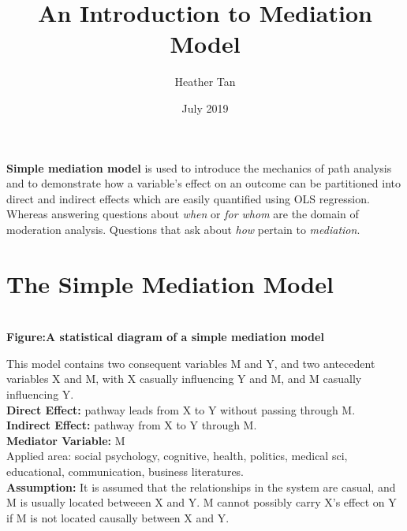 \documentclass{article}
\title{An Introduction to Mediation Model}
\author{Heather Tan}
\date{July 2019}
\theoremstyle{definition}
\begin{document}
\maketitle	
\tableofcontents
\pagebreak

\textbf{Simple mediation model} is used to introduce the mechanics of path analysis and to demonstrate how a variable's effect on an outcome can be partitioned into direct and indirect effects which are easily quantified using OLS regression.\\
Whereas answering questions about \textit{when} or \textit{for whom} are the domain of moderation analysis. Questions that ask about \textit{how} pertain to \textit{mediation}.

\section{The Simple Mediation Model}
\begin{center}
\\
\textbf{Figure:A statistical diagram of a simple mediation model}	
\end{center}
This model contains two consequent variables M and Y, and two antecedent variables X and M, with X casually influencing Y and M, and M casually influencing Y.\\
\textbf{Direct Effect:} pathway leads from X to Y without passing through M.\\
\textbf{Indirect Effect: }pathway from X to Y through M.\\
\textbf{Mediator Variable: }M\\
Applied area: social psychology, cognitive, health, politics, medical sci, educational, communication, business literatures.\\
\textbf{Assumption: }It is assumed that the relationships in the system are casual, and M is usually located betweeen X and Y. M cannot possibly carry X's effect on Y if M is not located causally between X and Y.
\end{document}
